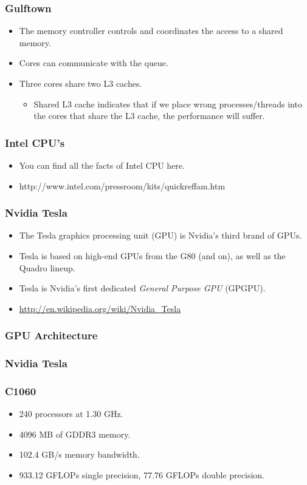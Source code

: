 \documentclass{beamer}
\begin{document}
\begin{CJK}{UTF8}{bsmi}
\begin{frame}
\frametitle{Gulftown}
\begin{itemize}
\item The memory controller controls and coordinates the access to a
  shared memory.
\item Cores can communicate with the queue.  
\item Three cores share two L3 caches.  
  \begin{itemize}
    \item Shared L3 cache indicates that if we place wrong processes/threads into the cores that share the L3 cache, the performance will suffer.
  \end{itemize}
\end{itemize}
\end{frame}

\begin{frame}
\frametitle{Intel CPU's}
\begin{itemize}
\item You can find all the facts of Intel CPU here.
\item http://www.intel.com/pressroom/kits/quickreffam.htm
\end{itemize}
\end{frame}

\begin{frame}
\frametitle{Nvidia Tesla}
\begin{itemize}
\item The Tesla graphics processing unit (GPU) is Nvidia's third brand
  of GPUs. 
\item Tesla is based on high-end GPUs from the G80 (and on), as well
  as the Quadro lineup.
\item Tesla is Nvidia's first dedicated {\em General Purpose GPU}
  (GPGPU).
\item \url{http://en.wikipedia.org/wiki/Nvidia_Tesla}
\end{itemize}
\end{frame}

\begin{frame}
\frametitle{GPU Architecture}
\centerline{}
\end{frame}

\begin{frame}
\frametitle{Nvidia Tesla}
\centerline{}
\end{frame}

\begin{frame}
\frametitle{C1060}
\begin{itemize}
\item 240 processors at 1.30 GHz.
\item 4096 MB of GDDR3 memory.
\item 102.4 GB/s memory bandwidth.
\item 933.12 GFLOPs single precision, 77.76 GFLOPs double precision.
\end{itemize}
\end{frame}


\end{CJK}
\end{document}
